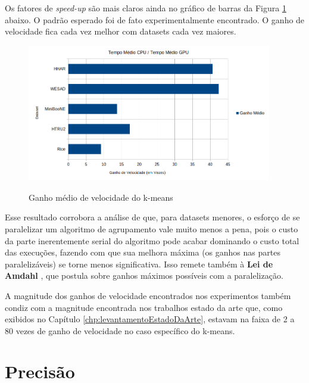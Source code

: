 \documentclass[12pt,
openright, 
oneside, %
a4paper,    %
brazil]{facom-ufu-abntex2}
\begin{document}
Os fatores de \textit{speed-up} são mais claros ainda no gráfico de barras da Figura \ref{fig:kMeansAvgSpeedup} abaixo. O padrão esperado foi de fato experimentalmente encontrado. O ganho de velocidade fica cada vez melhor com datasets cada vez maiores.

\begin{figure}[h]
  \caption{Ganho médio de velocidade do k-means}
  \centering
  \includegraphics[width=0.95\textwidth]{kMeansAvgSpeedup.png}
  \label{fig:kMeansAvgSpeedup}
\end{figure}

Esse resultado corrobora a análise de que, para datasets menores, o esforço de se paralelizar um algoritmo de agrupamento vale muito menos a pena, pois o custo da parte inerentemente serial do algoritmo pode acabar dominando o custo total das execuções, fazendo com que sua melhora máxima (os ganhos nas partes paralelizáveis) se torne menos significativa. Isso remete também à \textbf{Lei de Amdahl} \cite{Amdahl-Law}, que postula sobre ganhos máximos possíveis com a paralelização.

A magnitude dos ganhos de velocidade encontrados nos experimentos também condiz com a magnitude encontrada nos trabalhos estado da arte que, como exibidos no Capítulo \ref{chp:levantamentoEstadoDaArte}, estavam na faixa de 2 a 80 vezes de ganho de velocidade no caso específico do k-means.




\section{Precisão}
\label{sec:testesDePrecisao}

\end{document}
